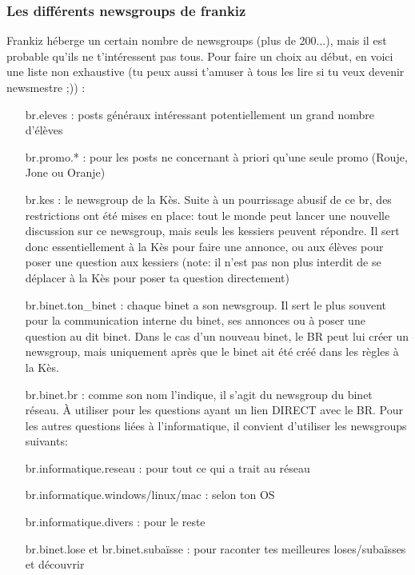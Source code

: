 \subsubsection{Les diff\'erents newsgroups de frankiz}
Frankiz h\'eberge un certain nombre de newsgroups (plus de 200...),
mais il est probable qu'ils ne t'int\'eressent pas tous.
Pour faire un choix au d\'ebut, en voici une liste non exhaustive
(tu peux aussi t'amuser \`a tous les lire si tu veux devenir newsmestre ;)) :
\begin{itemize}
 \item[br.eleves] : posts g\'en\'eraux int\'eressant potentiellement un grand nombre d'\'el\`eves
 \item[br.promo.*] : pour les posts ne concernant \`a priori qu'une seule promo (Rouje, Jone ou Oranje)
 \item[br.kes] : le newsgroup de la K\`es. Suite \`a un pourrissage abusif de ce br, des restrictions
                 ont \'et\'e mises en place: tout le monde peut lancer une nouvelle discussion sur ce newsgroup,
                 mais seuls les kessiers peuvent r\'epondre.
                 Il sert donc essentiellement \`a la K\`es pour faire une annonce, ou aux \'el\`eves
                 pour poser une question aux kessiers (note: il n'est pas non plus interdit
                 de se d\'eplacer \`a la K\`es pour poser ta question directement)
 \item[br.binet.ton\_binet] : chaque binet a son newsgroup. Il sert le plus souvent pour la communication interne
                              du binet, ses annonces ou \`a poser une question au dit binet.
                              Dans le cas d'un nouveau binet, le BR peut lui cr\'eer un newsgroup, mais uniquement
                              apr\`es que le binet ait \'et\'e cr\'e\'e dans les r\`egles \`a la K\`es.
 \item[br.binet.br] : comme son nom l'indique, il s'agit du newsgroup du binet r\'eseau.
                      \`A utiliser pour les questions ayant un lien DIRECT avec le BR.
                      Pour les autres questions li\'ees \`a l'informatique,
                      il convient d'utiliser les newsgroups suivants:
 \item[br.informatique.reseau] : pour tout ce qui a trait au r\'eseau
 \item[br.informatique.windows/linux/mac] : selon ton OS
 \item[br.informatique.divers] : pour le reste
 \item[br.binet.lose et br.binet.suba\"isse]: pour raconter tes meilleures loses/suba\"isses et d\'ecouvrir

\end{itemize}
